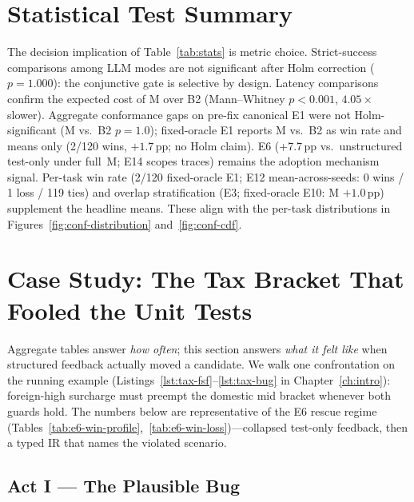 \section{Statistical Test Summary}
\label{sec:results:stats}



The decision implication of Table~\ref{tab:stats} is metric choice.
Strict-success comparisons among LLM modes are not significant after
Holm correction ($p{=}1.000$): the conjunctive gate is selective by design.
Latency comparisons confirm the expected cost of M over B2
(Mann--Whitney $p{<}0.001$, $4.05\times$ slower).
Aggregate conformance gaps on pre-fix canonical E1 were not Holm-significant
(M vs.\ B2 $p{=}1.0$); fixed-oracle E1 reports M vs.\ B2 as win rate and means
only (2/120 wins, ${+}1.7$\,pp; no Holm claim).
E6 (+7.7\,pp vs.\ unstructured test-only under full~M; E14 scopes
traces) remains the adoption mechanism signal.
Per-task win rate (2/120 fixed-oracle E1; E12 mean-across-seeds: 0 wins /
1 loss / 119 ties) and overlap stratification (E3; fixed-oracle E10:
M ${+}1.0$\,pp) supplement the headline means.
These align with the per-task distributions
in Figures~\ref{fig:conf-distribution} and~\ref{fig:conf-cdf}.

\section{Case Study: The Tax Bracket That Fooled the Unit Tests}
\label{sec:results:case-study}

Aggregate tables answer \emph{how often}; this section answers \emph{what it
felt like} when structured feedback actually moved a candidate.
We walk one confrontation on the running example 
(Listings~\ref{lst:tax-fsf}--\ref{lst:tax-bug} in Chapter~\ref{ch:intro}):
foreign-high surcharge must preempt the domestic mid bracket whenever both
guards hold.
The numbers below are representative of the E6 rescue regime
(Tables~\ref{tab:e6-win-profile},~\ref{tab:e6-win-loss})---collapsed
test-only feedback, then a typed IR that names the violated scenario.

\subsection*{Act I --- The Plausible Bug}

